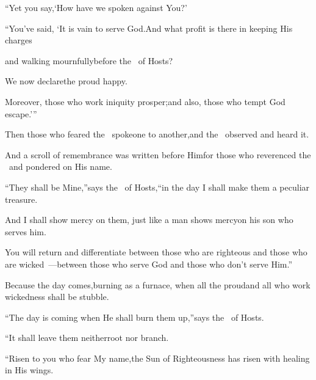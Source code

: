 \begin{inparaenum}
  \pb{}``Yet you say,\pa{}`How have we spoken against You?'%

  \pa{} ``You've said, `It is vain to serve God.\pa{}And what profit is there in keeping His charges%

  \pb{}and walking mournfully\pa{}before the \lord\ of Hosts?%

  \pa{} We now declare\pa{}the proud happy.%

  \pb{}Moreover, those who work iniquity prosper;\pa{}and also, those who tempt God escape.'\thinspace''%

  \pa{} Then those who feared the \lord\ spoke\pa{}one to another,\pa{}and the \lord\ observed and heard it.%

  \pb{}And a scroll of remembrance was written before Him\pa{}for those who reverenced the \lord\ and pondered on His name.%

  \pa{} ``They shall be Mine,''\pa{}says the \lord\ of Hosts,\pa{}``in the day I shall make them a peculiar treasure.%

  \pb{}And I shall show mercy on them, just like a man shows mercy\pa{}on his son who serves him.%

  \pa{} You will return and differentiate between those who are righteous and those who are wicked~---\pa{}between those who serve God and those who don't serve Him.''%

  \pa{}%
  Because the day comes,\pa{}burning as a furnace,%
  \pa{}when all the proud\pa{}and all who work wickedness shall be stubble.%

  \pb{}``The day is coming when He shall burn them up,''\pa{}says the \lord\ of Hosts.%

  \pb{}``It shall leave them neither\pa{}root nor branch.%

  \pa{} ``Risen to you who fear My name,\pa{}the Sun%
  of Righteousness has risen with healing in His wings.%


\end{inparaenum}
